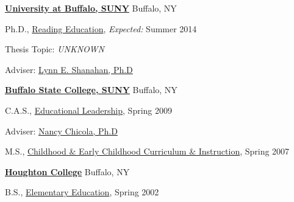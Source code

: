 \href{http://www.buffalo.edu/}{\textbf{University at Buffalo, SUNY}}
Buffalo, NY
\begin{outerlist}

\item[] Ph.D.,
        \href{http://gse.buffalo.edu/lai/doc}
             {Reading Education},
             \emph{Expected:} Summer 2014
        \begin{innerlist}
        \item Thesis Topic: \emph{UNKNOWN}
        \item Adviser:
              \href{http://gse.buffalo.edu/about/directory/faculty/2110}
                   {Lynn E. Shanahan, Ph.D} 
        \end{innerlist}
\end{outerlist}
\vspace{.1in}

\href{http://www.buffalostate.edu/}{\textbf{Buffalo State College, SUNY}}
Buffalo, NY
\begin{outerlist}

\item[] C.A.S.,
        \href{http://www.buffalostate.edu/gradprog.xml?bpid=27}
             {Educational Leadership},
             Spring 2009
        \begin{innerlist}
        \item Adviser:
              \href{http://elementaryeducation.buffalostate.edu/faculty/nancy-chicola}
                   {Nancy Chicola, Ph.D} 
        \end{innerlist}
\end{outerlist}
\vspace{.1in}

\begin{outerlist}

\item[] M.S.,
        \href{http://www.buffalostate.edu/gradprog.xml?bpid=27}
             {Childhood \& Early Childhood Curriculum \& Instruction},
             Spring 2007
\end{outerlist}
\vspace{.1in}

\href{http://www.houghton.edu/}{\textbf{Houghton College}}
Buffalo, NY
\begin{outerlist}

\item[] B.S.,
        \href{http://www.houghton.edu/education/}
             {Elementary Education},
             Spring 2002
\end{outerlist}
\vspace{.1in}


